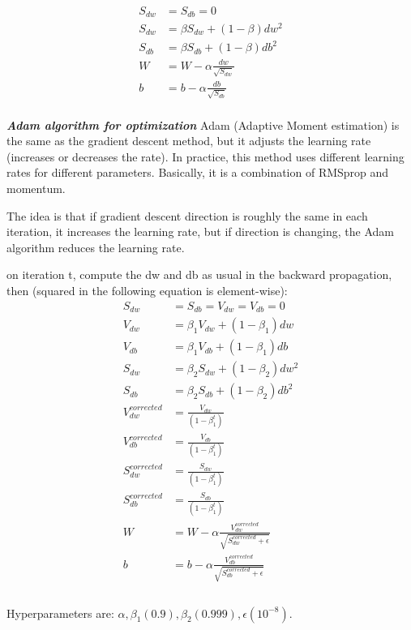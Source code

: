 \documentclass[12pt]{report}
\begin{document}
\begin{align}
  S_{dw} &= S_{db} = 0 \\
  S_{dw} &= \beta S_{dw} + (1-\beta) dw^2\\
  S_{db} &= \beta S_{db} + (1-\beta) db^2\\
  W &= W- \alpha \frac{dw}{\sqrt{S_{dw}}} \\
  b &= b- \alpha \frac{db}{\sqrt{S_{db}}} \\
\end{align}


\textbf{\textit{Adam algorithm for optimization}}
Adam (Adaptive Moment estimation) is the same as the gradient descent method, but it adjusts the learning rate (increases or decreases the rate). In practice, this method uses different learning rates for different parameters. Basically, it is a combination of RMSprop and momentum.

The idea is that if gradient descent direction is roughly the same in each iteration, it increases the learning rate, but if direction is changing, the Adam algorithm reduces the learning rate.

on iteration t, compute the dw and db as usual in the backward propagation, then (squared in the following equation is element-wise):
\begin{align}
  S_{dw} &= S_{db} = V_{dw} = V_{db} = 0 \\
  V_{dw} &= \beta_1 V_{dw} + (1-\beta_1) dw \\
  V_{db} &=  \beta_1 V_{db} + (1-\beta_1) db \\
  S_{dw} &= \beta_2 S_{dw} + (1-\beta_2) dw^2\\
  S_{db} &= \beta_2 S_{db} + (1-\beta_2) db^2\\
  V_{dw}^{corrected} &= \frac{V_{dw}}{(1-\beta_1^t)} \\
  V_{db}^{corrected} &= \frac{V_{db}}{(1-\beta_1^t)} \\
  S_{dw}^{corrected} &= \frac{S_{dw}}{(1-\beta_1^t)} \\
  S_{db}^{corrected} &= \frac{S_{db}}{(1-\beta_1^t)} \\
  W &= W- \alpha \frac{V_{dw}^{corrected}}{\sqrt{S_{dw}^{corrected} + \epsilon}} \\
  b &= b- \alpha \frac{V_{db}^{corrected}}{\sqrt{S_{db}^{corrected} + \epsilon}} \\ \\
\end{align}

Hyperparameters are: $\alpha, \beta_1(0.9), \beta_2(0.999), \epsilon (10^{-8})$.
\end{document}
